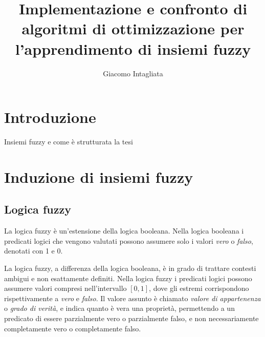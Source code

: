 \documentclass[a4paper,12pt]{report}
\begin{document}
\title{Implementazione e confronto di algoritmi di ottimizzazione per l'apprendimento di insiemi fuzzy}
\author{Giacomo Intagliata}
%
% 
%
\beforepreface

%
%
\afterpreface

%
\chapter*{Introduzione}
\label{Introduzione}
%
Insiemi fuzzy e come è strutturata la tesi
% 


\chapter{Induzione di insiemi fuzzy}
\label{Capitolo 1}
\section{Logica fuzzy}
La logica fuzzy \cite{logica_fuzzy} è un'estensione della logica booleana.
Nella logica booleana i predicati logici che vengono valutati possono assumere solo i valori \textit{vero} o \textit{falso}, denotati con 1 e 0.

La logica fuzzy, a differenza della logica booleana, è in grado di trattare contesti ambigui e non esattamente definiti.
Nella logica fuzzy i predicati logici possono assumere valori compresi nell'intervallo $[0,1]$, dove gli estremi corrispondono rispettivamente a \textit{vero} e \textit{falso}.
Il valore assunto è chiamato \textit{valore di appartenenza} o \textit{grado di verità}, e indica quanto è vera una proprietà, permettendo a un predicato di essere parzialmente vero o parzialmente falso, e non necessariamente completamente vero o completamente falso.
\end{document}
